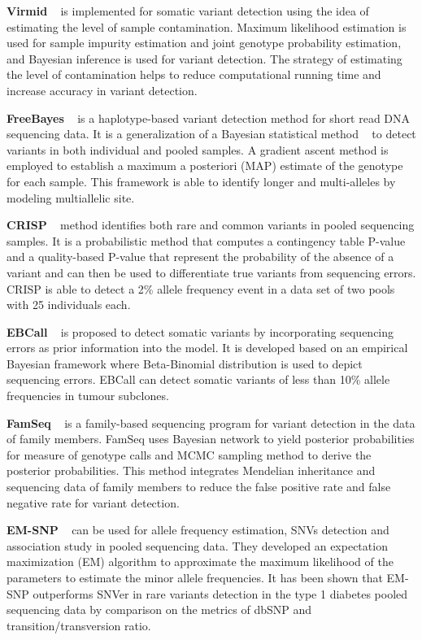 \documentclass[11pt,reqno]{amsart}
\begin{document}
\textbf{Virmid} ~\citep{Kim2013} is implemented for somatic variant detection using the idea of estimating the level of sample contamination.
Maximum likelihood estimation is used for sample impurity estimation and joint genotype probability estimation, and Bayesian inference is used for variant detection.
The strategy of estimating the level of contamination helps to reduce computational running time and increase accuracy in variant detection.

\textbf{FreeBayes} ~\citep{Garrison2012} is a haplotype-based variant detection method for short read DNA sequencing data.
It is a generalization of a Bayesian statistical method ~\citep{marth1999general} to detect variants in both individual and pooled samples.
A gradient ascent method is employed to establish a maximum a posteriori (MAP) estimate of the genotype for each sample.
This framework is able to identify longer and multi-alleles by modeling multiallelic site.

\textbf{CRISP} ~\citep{Bansal2010} method identifies both rare and common variants in pooled sequencing samples.
It is a probabilistic method that computes a contingency table P-value and a quality-based P-value that represent the probability of the absence of a variant and can then be used to differentiate true variants from sequencing errors.
CRISP is able to detect a 2\% allele frequency event in a data set of two pools with 25 individuals each.

\textbf{EBCall} ~\citep{Shiraishi2013} is proposed to detect somatic variants by incorporating sequencing errors as prior information into the model.
It is developed based on an empirical Bayesian framework where Beta-Binomial distribution is used to depict sequencing errors.
EBCall can detect somatic variants of less than 10\% allele frequencies in tumour subclones.

\textbf{FamSeq} ~\citep{Peng2013} is a family-based sequencing program for variant detection in the data of family members.
FamSeq uses Bayesian network to yield posterior probabilities for measure of genotype calls and MCMC sampling method to derive the posterior probabilities.
This method integrates Mendelian inheritance and sequencing data of family members to reduce the false positive rate and false negative rate for variant detection.

\textbf{EM-SNP} ~\citep{Chen2013} can be used for allele frequency estimation, SNVs detection and association study in pooled sequencing data.
They developed an expectation maximization (EM) algorithm to approximate the maximum likelihood of the parameters to estimate the minor allele frequencies.
It has been shown that EM-SNP outperforms SNVer in rare variants detection in the type 1 diabetes pooled sequencing data by comparison on the metrics of dbSNP and transition/transversion ratio.
\end{document}
